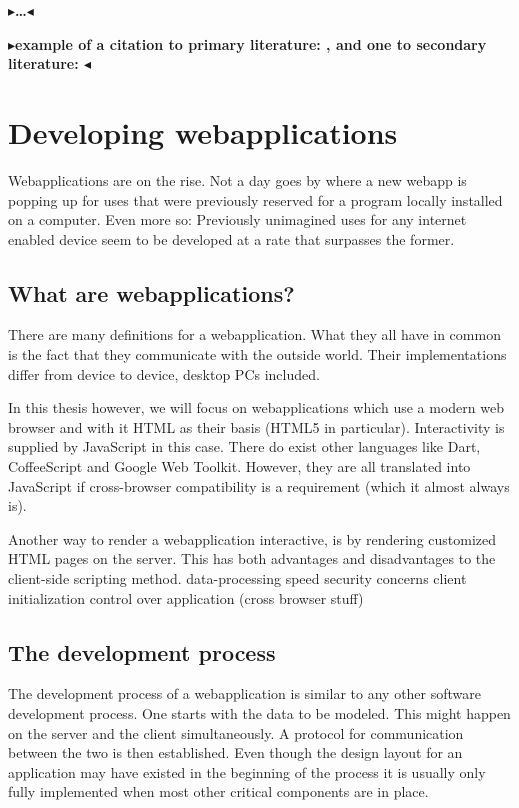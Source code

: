 \documentclass[twoside,11pt,openright]{report}
\newcommand{\todo}[1]{{\color[rgb]{.5,0,0}\textbf{$\blacktriangleright$#1$\blacktriangleleft$}}}
\begin{document}
\todo{\dots}

\todo{example of a citation to primary literature: \citeA{lazypropagation2010},
and one to secondary literature: \citeB{ambiguity2010}}


\chapter{Developing webapplications}
Webapplications are on the rise. Not a day goes by where a new
webapp is popping up for uses that were previously reserved for a
program locally installed on a computer. Even more so: Previously
unimagined uses for any internet enabled device seem to be developed
at a rate that surpasses the former.

\section{What are webapplications?}
There are many definitions for a webapplication. What they all have in
common is the fact that they communicate with the outside world. Their
implementations differ from device to device, desktop PCs included.

In this thesis however, we will focus on webapplications which use a
modern web browser and with it HTML as their basis (HTML5 in particular).
Interactivity is supplied by JavaScript in this case.
There do exist other languages like Dart, CoffeeScript and Google Web Toolkit.
However, they are all translated into JavaScript if cross-browser
compatibility is a requirement (which it almost always is).

Another way to render a webapplication interactive, is by
rendering customized HTML pages on the server. This has both advantages
and disadvantages to the client-side scripting method.
data-processing speed
security concerns
client initialization
control over application (cross browser stuff)

\section{The development process}
The development process of a webapplication is similar to any other
software development process. One starts with the data to be modeled.
This might happen on the server and the client simultaneously.
A protocol for communication between the two is then established.
Even though the design layout for an application may have existed in
the beginning of the process it is usually only fully implemented when
most other critical components are in place.
\end{document}
